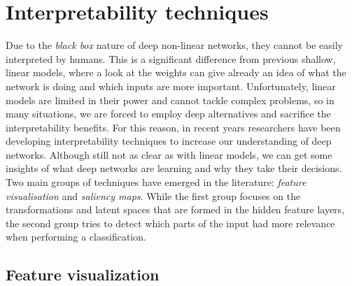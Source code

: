 



\section{Interpretability techniques}

Due to the \textit{black box} nature of deep non-linear networks, they cannot be easily interpreted by humans. This is a significant difference from previous shallow, linear models, where a look at the weights can give already an idea of what the network is doing and which inputs are more important. Unfortunately, linear models are limited in their power and cannot tackle complex problems, so in many situations, we are forced to employ deep alternatives and sacrifice the interpretability benefits. For this reason, in recent years researchers have been developing interpretability techniques to increase our understanding of deep networks. Although still not as clear as with linear models, we can get some insights of what deep networks are learning and why they take their decisions. Two main groups of techniques have emerged in the literature: \textit{feature visualisation} and \textit{saliency maps}. While the first group focuses on the transformations and latent spaces that are formed in the hidden feature layers, the second group tries to detect which parts of the input had more relevance when performing a classification.

\subsection{Feature visualization}\label{sect:featvis}


